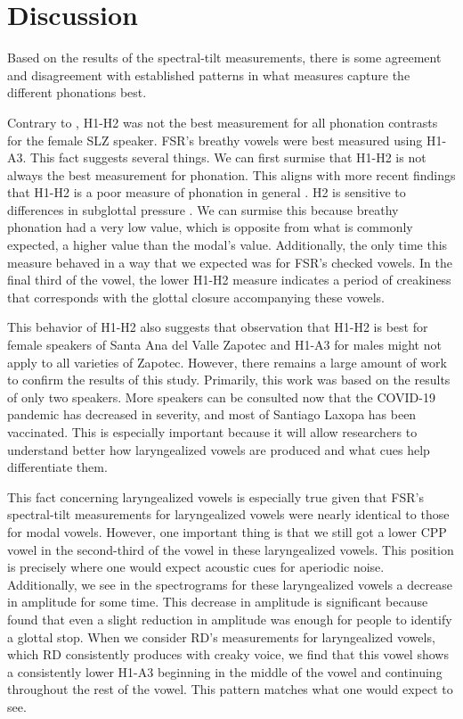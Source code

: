 \documentclass[12pt, letterpaper]{article}
\begin{document}
\section{Discussion} \label{sec:Discussion}

Based on the results of the spectral-tilt measurements, there is some agreement and disagreement with established patterns in what measures capture the different phonations best. 

Contrary to \citet{espositoVariationContrastivePhonation2010}, H1-H2 was not the best measurement for all phonation contrasts for the female SLZ speaker. FSR's breathy vowels were best measured using H1-A3. This fact suggests several things. We can first surmise that H1-H2 is not always the best measurement for phonation. This aligns with more recent findings that H1-H2 is a poor measure of phonation in general \citep{chaiH1H2Acoustic2022}. H2 is sensitive to differences in subglottal pressure \citep{sundbergObjectiveCharacterizationPhonation2022}. We can surmise this because breathy phonation had a very low value, which is opposite from what is commonly expected, a higher value than the modal's value. Additionally, the only time this measure behaved in a way that we expected was for FSR's checked vowels. In the final third of the vowel, the lower H1-H2 measure indicates a period of creakiness that corresponds with the glottal closure accompanying these vowels. 

This behavior of H1-H2 also suggests that  observation that H1-H2 is best for female speakers of Santa Ana del Valle Zapotec and H1-A3 for males might not apply to all varieties of Zapotec. However, there remains a large amount of work to confirm the results of this study. Primarily, this work was based on the results of only two speakers. More speakers can be consulted now that the COVID-19 pandemic has decreased in severity, and most of Santiago Laxopa has been vaccinated. This is especially important because it will allow researchers to understand better how laryngealized vowels are produced and what cues help differentiate them. 

This fact concerning laryngealized vowels is especially true given that FSR's spectral-tilt measurements for laryngealized vowels were nearly identical to those for modal vowels. However, one important thing is that we still got a lower CPP vowel in the second-third of the vowel in these laryngealized vowels. This position is precisely where one would expect acoustic cues for aperiodic noise. Additionally, we see in the spectrograms for these laryngealized vowels a decrease in amplitude for some time. This decrease in amplitude is significant because \citet{gerfenProductionPerceptionLaryngealized2005} found that even a slight reduction in amplitude was enough for people to identify a glottal stop. When we consider RD's measurements for laryngealized vowels, which RD consistently produces with creaky voice, we find that this vowel shows a consistently lower H1-A3 beginning in the middle of the vowel and continuing throughout the rest of the vowel. This pattern matches what one would expect to see.
\end{document}
